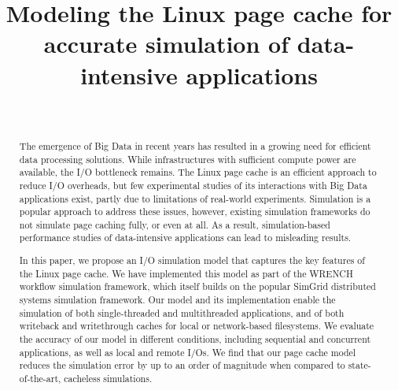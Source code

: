 \documentclass[conference]{IEEEtran}
\newcommand{\simgrid}{SimGrid\xspace}
\newcommand{\wrench}{WRENCH\xspace}
\begin{document}
\title{Modeling the Linux page cache for accurate simulation of data-intensive applications}

\author{
  \\
}

\maketitle

    \begin{abstract}

    The emergence of Big Data in recent years has resulted in a growing
    need for efficient data processing solutions. While infrastructures
    with sufficient compute power are available,
    the I/O bottleneck remains. The Linux page cache is an efficient
    approach to reduce I/O overheads, but few
    experimental studies of its interactions with Big Data applications exist,
    partly due to limitations of
    real-world experiments. Simulation is a popular approach to address
    these issues, however, existing simulation frameworks do not simulate
    page caching fully, or even at all.  As a result, simulation-based
    performance studies of data-intensive applications can lead to misleading
    results.

    In this paper, we propose an I/O simulation model that captures
    the key features of the Linux page cache. We have implemented this model
    as part of the \wrench workflow simulation framework, which itself
    builds on the popular \simgrid distributed systems simulation
    framework. Our model and its implementation enable the simulation
    of both single-threaded and multithreaded applications, and of both
    writeback and writethrough caches for local or network-based
    filesystems. We evaluate the accuracy of our model in different
    conditions, including sequential and concurrent applications, as
    well as local and remote I/Os. We find that our page cache model
    reduces the simulation error by up to an order of magnitude when
    compared to state-of-the-art, cacheless simulations.

    \end{abstract}
\end{document}
